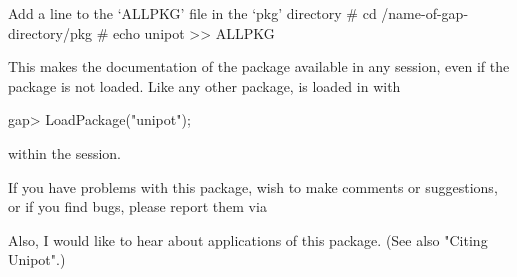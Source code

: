 Add a line to the `ALLPKG' file in the `pkg' directory
\begintt
# cd /name-of-gap-directory/pkg
# echo unipot >> ALLPKG
\endtt

This makes the  documentation  of the package  available  in any  {}
session,  even  if the  package  is not loaded. Like  any other  package,
{\Unipot} is loaded in {\GAP} with

\beginexample
gap> LoadPackage("unipot");
\endexample

within the {} session.

If you have problems with this package, wish to make comments
or suggestions, or if you find bugs, please report them via


Also, I would like to hear about applications of this package.
(See also "Citing Unipot".)




